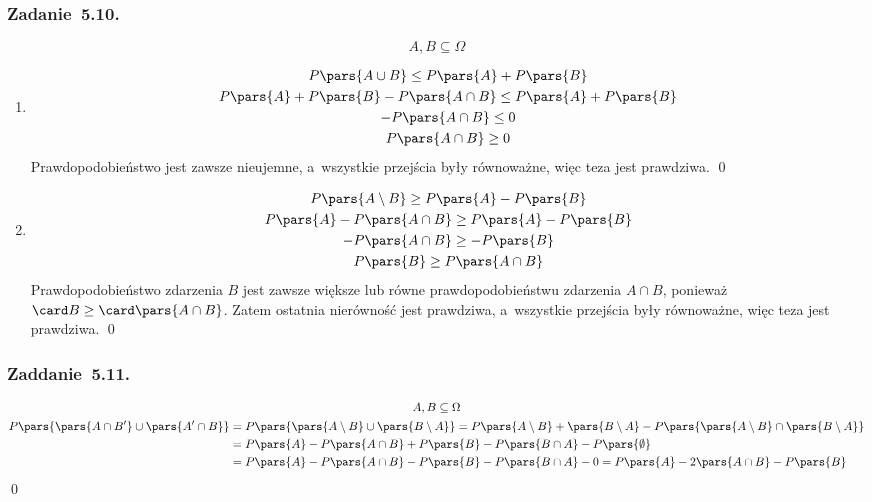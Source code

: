 \subsubsection*{Zadanie~5.10.}
\begin{equation*}
    A, B \subseteq \Omega
\end{equation*}
\begin{enumerate}[label={\alph*)}]
    \item
        \begin{gather*}
            P\pars{A \cup B} \leq P\pars{A} + P\pars{B}\\
            P\pars{A} + P\pars{B} - P\pars{A \cap B} \leq P\pars{A} + P\pars{B}\\
            -P\pars{A \cap B} \leq 0\\
            P\pars{A \cap B} \geq 0
        \end{gather*}
        Prawdopodobieństwo jest zawsze nieujemne, a~wszystkie przejścia były równoważne, więc teza jest prawdziwa.
        \qed
    \item
        \begin{gather*}
            P\pars{A \setminus B} \geq P\pars{A} - P\pars{B}\\
            P\pars{A} - P\pars{A \cap B} \geq P\pars{A} - P\pars{B}\\
            -P\pars{A \cap B} \geq -P\pars{B}\\
            P\pars{B} \geq P\pars{A \cap B}
        \end{gather*}
        Prawdopodobieństwo zdarzenia \(B\) jest zawsze większe lub równe prawdopodobieństwu zdarzenia \(A \cap B\), ponieważ \(\card B \geq \card\pars{A \cap B}\). Zatem ostatnia nierówność jest prawdziwa, a~wszystkie przejścia były równoważne, więc teza jest prawdziwa.
        \qed
\end{enumerate}
\subsubsection*{Zaddanie~5.11.}
\begin{gather*}
    A, B \subseteq \Omega\\
    \begin{split}
        P\pars{\pars{A \cap B'} \cup \pars{A' \cap B}}
            &= P\pars{\pars{A \setminus B} \cup \pars{B \setminus A}}
            = P\pars{A \setminus B} + \pars{B \setminus A} - P\pars{\pars{A \setminus B} \cap \pars{B \setminus A}}\\
            &= P\pars{A} - P\pars{A \cap B} + P\pars{B} - P\pars{B \cap A} - P\pars{\emptyset}\\
            &= P\pars{A} - P\pars{A \cap B} - P\pars{B} - P\pars{B \cap A} - 0
            = P\pars{A} - 2\pars{A \cap B} - P\pars{B}
    \end{split}
\end{gather*}
\qed
